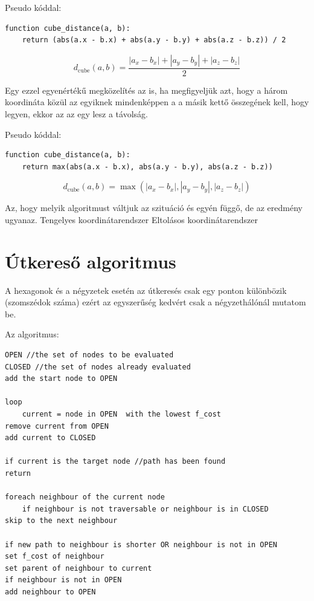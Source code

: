 Pseudo kóddal:

\begin{verbatim}
function cube_distance(a, b):
    return (abs(a.x - b.x) + abs(a.y - b.y) + abs(a.z - b.z)) / 2
\end{verbatim}

$$
d_{\text{cube}}(a, b) =
\dfrac{|a_x - b_x| + |a_y - b_y| + |a_z - b_z|}{2}
$$

Egy ezzel egyenértékű megközelítés az is, ha megfigyeljük azt, hogy a három koordináta közül az egyiknek mindenképpen a a másik kettő összegének kell, hogy legyen, ekkor az az egy lesz a távolság. 

Pseudo kóddal:
\begin{verbatim}
function cube_distance(a, b):
    return max(abs(a.x - b.x), abs(a.y - b.y), abs(a.z - b.z))
\end{verbatim}

$$
d_{\text{cube}}(a, b) =
\max(
|a_x - b_x|, |a_y - b_y|, |a_z - b_z|
)
$$

Az, hogy melyik algoritmust váltjuk az szituáció és egyén függő, de az eredmény ugyanaz.
Tengelyes koordinátarendszer
Eltolásos koordinátarendszer

\section{Útkereső algoritmus}

A hexagonok és a négyzetek esetén az útkeresés csak egy ponton különbözik (szomszédok száma) ezért az egyszerűség kedvért csak a négyzethálónál mutatom be.

Az algoritmus: 

\begin{verbatim}
OPEN //the set of nodes to be evaluated
CLOSED //the set of nodes already evaluated
add the start node to OPEN

loop
	current = node in OPEN  with the lowest f_cost
remove current from OPEN
add current to CLOSED

if current is the target node //path has been found
return

foreach neighbour of the current node
	if neighbour is not traversable or neighbour is in CLOSED
skip to the next neighbour

if new path to neighbour is shorter OR neighbour is not in OPEN
set f_cost of neighbour
set parent of neighbour to current
if neighbour is not in OPEN
add neighbour to OPEN
\end{verbatim}

